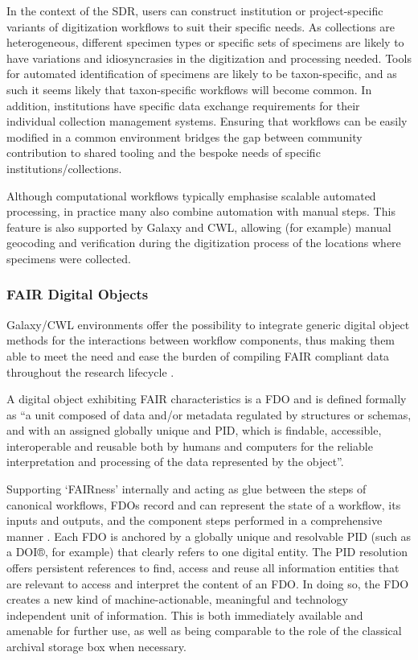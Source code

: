 In the context of the \acrshort{SDR}, users can construct institution or
project-specific variants of digitization workflows to suit their
specific needs. As collections are heterogeneous, different specimen
types or specific sets of specimens are likely to have variations and
idiosyncrasies in the digitization and processing needed. Tools for
automated identification of specimens are likely to be taxon-specific,
and as such it seems likely that taxon-specific workflows will become
common. In addition, institutions have specific data exchange
requirements for their individual collection management systems.
Ensuring that workflows can be easily modified in a common environment
bridges the gap between community contribution to shared tooling and the
bespoke needs of specific institutions/collections.

Although computational workflows typically emphasise scalable automated
processing, in practice many also combine automation with manual steps.
This feature is also supported by Galaxy and CWL, allowing (for example)
manual geocoding and verification during the digitization process of the
locations where specimens were collected.

\subsubsection{FAIR Digital Objects}\label{fair-digital-objects-1}

Galaxy/CWL environments offer the possibility to integrate generic
digital object methods \cite{Hui 2012,Kallinikos 2013,Kahn 2006} for the interactions between
workflow components, thus making them able to meet the need and ease the
burden of compiling FAIR compliant data throughout the research
lifecycle \cite{Wittenburg 2022b}.

A digital object exhibiting FAIR characteristics is a 
\acrlong{FDO}
\cite{De Smedt 2020} and is defined formally as ``a unit composed of data
and/or metadata regulated by structures or schemas, and with an assigned
globally unique and \acrfull{PID}, which is findable,
accessible, interoperable and reusable both by humans and computers for
the reliable interpretation and processing of the data represented by
the object''.

Supporting `FAIRness' internally and acting as glue between the steps of
canonical workflows, FDOs record and can represent the state of a
workflow, its inputs and outputs, and the component steps performed in a
comprehensive manner \cite{Wittenburg 2022b}. Each FDO is anchored by a globally unique
and resolvable \acrshort{PID} (such as a \acrshort{DOI}®, for
example) that clearly refers to one digital entity. The PID resolution
offers persistent references to find, access and reuse all information
entities that are relevant to access and interpret the content of an
FDO. In doing so, the FDO creates a new kind of machine-actionable,
meaningful and technology independent unit of information. This is both
immediately available and amenable for further use, as well as being
comparable to the role of the classical archival storage box when
necessary.

